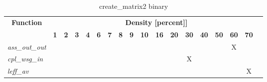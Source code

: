 \begin{table}[h] \centering \begin{tabular}{|l|c|c|c|c|c|c|c|c|c|c|c|c|c|c|c|c|} \hline\multicolumn{1}{|c|}{\textbf{\large{Function}}} & \multicolumn{17}{c|}{\large{\textbf{Density [percent]]}}}\\\cline{2-18}  & \textbf{1} &  \textbf{2} &  \textbf{3} &  \textbf{4} &  \textbf{6} &  \textbf{7} &  \textbf{8} &  \textbf{9} &  \textbf{10} &  \textbf{16} &  \textbf{20} &  \textbf{30} &  \textbf{40} &  \textbf{50} &  \textbf{60} &  \textbf{70} \\ \hline   \textit{ass\_out\_out} &   &   &   &   &   &   &   &   &   &   &   &   &   &   & X &   \\ \hline  \textit{cpl\_wsg\_in} &   &   &   &   &   &   &   &   &   &   &   & X &   &   &   &   \\ \hline  \textit{leff\_av} &   &   &   &   &   &   &   &   &   &   &   &   &   &   &   & X \\ \hline \end{tabular}\caption{create\_matrix2 binary}\label{tab:my_label} \end{table}
